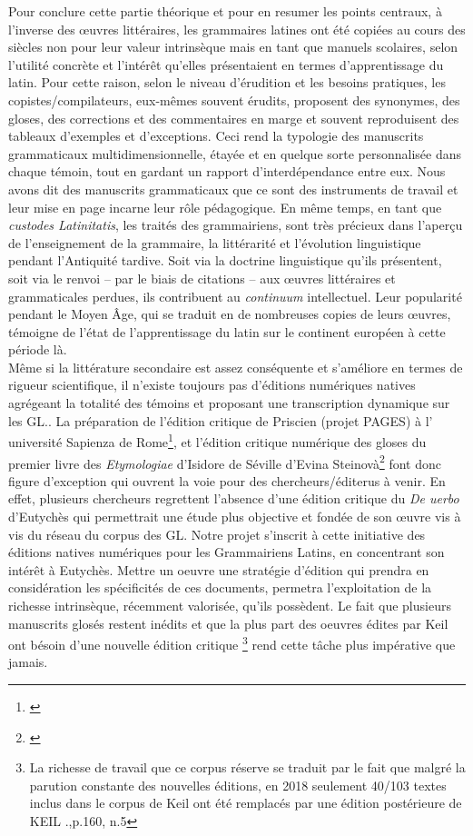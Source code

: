 \documentclass[a4paper, twoside, 12pt]{book}
\begin{document}
Pour conclure cette partie théorique et pour en resumer les points centraux, à l'inverse des œuvres littéraires, les grammaires latines ont été copiées au cours des siècles non pour leur \og{}valeur intrinsèque \fg{} mais en tant que manuels scolaires, selon l’utilité concrète et l’intérêt qu’elles présentaient en termes d’apprentissage du latin. Pour cette raison, selon le niveau d’érudition et les besoins pratiques, les copistes/compilateurs, eux-mêmes souvent érudits, proposent des synonymes, des gloses, des corrections et des commentaires en marge et souvent reproduisent des tableaux d'exemples et d'exceptions. Ceci rend la typologie des manuscrits grammaticaux multidimensionnelle, étayée et en quelque sorte personnalisée dans chaque témoin, tout en gardant un rapport d'interdépendance entre eux. Nous avons dit des manuscrits grammaticaux que ce sont des instruments de travail et leur mise en page incarne leur rôle pédagogique. En même temps, en tant que \textit{custodes Latinitatis}, les traités des grammairiens, sont très précieux dans l’aperçu de l’enseignement de la grammaire, la littérarité et l’évolution linguistique pendant l’Antiquité tardive. Soit via la doctrine linguistique qu’ils présentent, soit via le renvoi – par le biais de citations – aux œuvres littéraires et grammaticales perdues, ils contribuent au \textit{continuum} intellectuel. Leur popularité pendant le Moyen Âge, qui se traduit en de nombreuses copies de leurs œuvres, témoigne de l’état de l’apprentissage du latin sur le continent européen à cette période là. \\

Même si la littérature secondaire est assez conséquente et s’améliore en termes de rigueur scientifique, il n’existe toujours pas d’éditions numériques natives agrégeant la totalité des témoins et proposant une transcription \og{} dynamique \fg{} sur les GL.. La préparation de l’édition critique de Priscien (projet PAGES) à l’ université Sapienza de Rome\footnote{\cite{monella2019digital}}, et l'édition critique numérique des gloses du premier livre des \textit{Etymologiae} d'Isidore de Séville d'Evina Steinovà\footnote{\cite{steinova2021glosses}} font donc figure d’exception qui ouvrent la voie pour des chercheurs/éditerus à venir. En effet, plusieurs chercheurs regrettent l’absence d’une édition critique du \textit{De uerbo} d’Eutychès qui permettrait une étude plus objective et fondée de son œuvre vis à vis du réseau du corpus des GL. Notre projet s’inscrit à cette initiative des éditions natives numériques pour les Grammairiens Latins, en concentrant son intérêt à Eutychès. Mettre un oeuvre une stratégie d'édition qui prendra en considération les spécificités de ces documents, permetra l'exploitation de la richesse intrinsèque, récemment valorisée, qu'ils possèdent. Le fait que plusieurs manuscrits glosés restent inédits et que la plus part des oeuvres édites par Keil ont bésoin d'une nouvelle édition critique \footnote{La richesse de travail que ce corpus réserve se traduit par le fait que malgré la parution constante des nouvelles éditions, en 2018 seulement 40/103 textes inclus dans le corpus de Keil ont été remplacés par une édition postérieure de KEIL .\cite{zetzel2018critics},p.160, n.5} rend cette tâche plus impérative que jamais.
\end{document}
